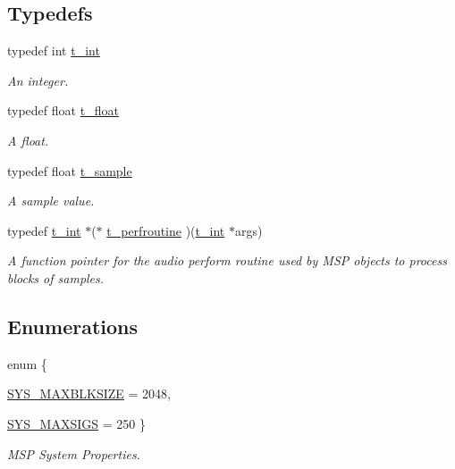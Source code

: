 \subsection*{Typedefs}
\begin{DoxyCompactItemize}
\item 
typedef int \hyperlink{group__msp_gaaca420c8a41d33afb2f9e783ce6059e3}{t\_\-int}
\begin{DoxyCompactList}\small\item\em An integer. \item\end{DoxyCompactList}\item 
typedef float \hyperlink{group__msp_gab68e234c9dccbd3d62659023db9f9486}{t\_\-float}
\begin{DoxyCompactList}\small\item\em A float. \item\end{DoxyCompactList}\item 
typedef float \hyperlink{group__msp_ga8ecd36423b35083714b8740c40b57120}{t\_\-sample}
\begin{DoxyCompactList}\small\item\em A sample value. \item\end{DoxyCompactList}\item 
typedef \hyperlink{group__msp_gaaca420c8a41d33afb2f9e783ce6059e3}{t\_\-int} $\ast$($\ast$ \hyperlink{group__msp_gad1bc58df327774373ee9e10ad9026564}{t\_\-perfroutine} )(\hyperlink{group__msp_gaaca420c8a41d33afb2f9e783ce6059e3}{t\_\-int} $\ast$args)
\begin{DoxyCompactList}\small\item\em A function pointer for the audio perform routine used by MSP objects to process blocks of samples. \item\end{DoxyCompactList}\end{DoxyCompactItemize}
\subsection*{Enumerations}
\begin{DoxyCompactItemize}
\item 
enum \{ \par
\hyperlink{group__msp_ggadb49720dc49f7d4e4cf9adbf2948e409a29738f7ba126b5468181b4c017e573d0}{SYS\_\-MAXBLKSIZE} =  2048, 
\par
\hyperlink{group__msp_ggadb49720dc49f7d4e4cf9adbf2948e409a00acca9cc1491d6006a4c38127f02a90}{SYS\_\-MAXSIGS} =  250
 \}
\begin{DoxyCompactList}\small\item\em MSP System Properties. \item\end{DoxyCompactList}\end{DoxyCompactItemize}

